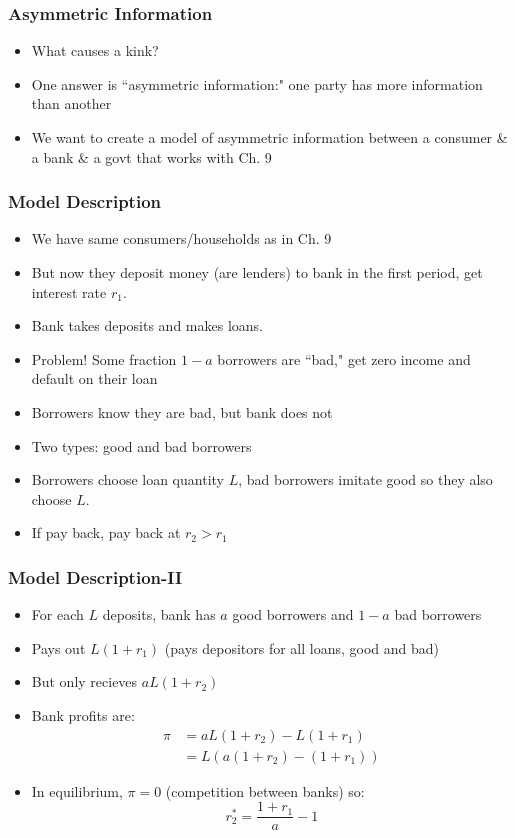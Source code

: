 \documentclass{beamer}
\begin{document}
\begin{frame}
\frametitle[alignment=center]{Asymmetric Information}
\begin{itemize}
\item What causes a kink?
\bigskip
\item One answer is ``asymmetric information:" one party has more information than another
\bigskip
\item We want to create a model of asymmetric information between a consumer \& a bank \& a govt that works with Ch. 9
\end{itemize}
\end{frame}


\begin{frame}
\frametitle[alignment=center]{Model Description}
\begin{itemize}
\item We have same consumers/households as in Ch. 9
\bigskip
\item But now they deposit money (are lenders) to bank in the first period, get interest rate $r_1$.
\bigskip
\item Bank takes deposits and makes loans.  
\bigskip
\item Problem!  Some fraction $1-a$ borrowers are ``bad," get zero income and default on their loan
\bigskip
\item Borrowers know they are bad, but bank does not 
\bigskip
\item Two types: good and bad borrowers
\bigskip
\item Borrowers choose loan quantity $L$, bad borrowers imitate good so they also choose $L$.  
\bigskip
\item If pay back, pay back at $r_2>r_1$
\end{itemize}
\end{frame}

\begin{frame}
\frametitle[alignment=center]{Model Description-II}
\begin{itemize}
\item For each $L$ deposits, bank has $a$ good borrowers and $1-a$ bad borrowers
\bigskip
\item Pays out $L(1+r_1)$ (pays depositors for all loans, good and bad)
\bigskip
\item But only recieves $aL(1+r_2)$
\bigskip
\item Bank profits are:
\begin{align*}
\pi & =aL(1+r_2)-L(1+r_1)\\
 & = L(a(1+r_2)-(1+r_1))
\end{align*}
\item In equilibrium, $\pi=0$ (competition between banks) so:
$$r_2^*=\frac{1+r_1}{a}-1$$
\end{itemize}
\end{frame}
\end{document}
